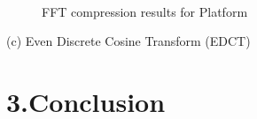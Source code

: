 \documentclass[12pt]{article}
\begin{document}
\begin{figure}[H]
    \centering
    \\
    \caption{FFT compression results for Platform}
    \label{ref_label_overall}
\end{figure}
\begin{flushleft}
(c) Even Discrete Cosine Transform (EDCT)
\end{flushleft}



\section*{3.\quad Conclusion}
\end{document}
